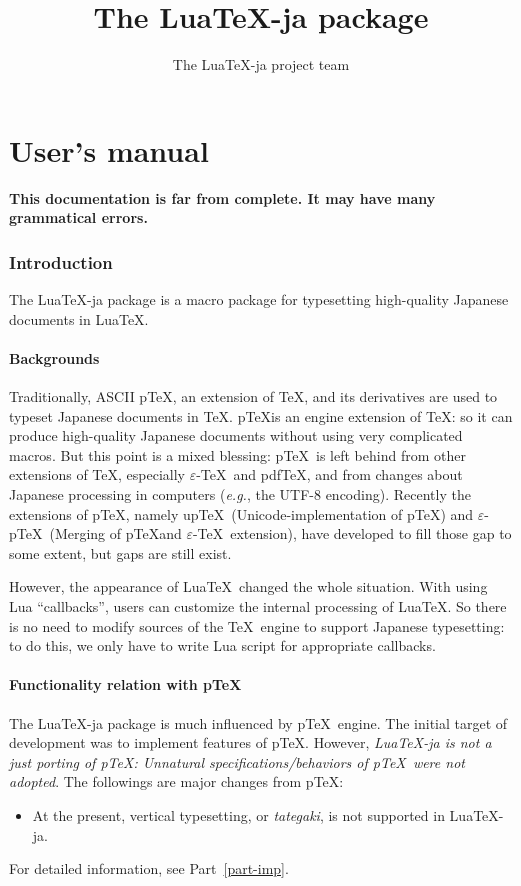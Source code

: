 \documentclass[a4paper,titlepage]{article}
\title{The Lua\TeX-ja package}
\author{The Lua\TeX-ja project team}
\begin{document}
\maketitle
\part{User's manual}
{\Large\bf This documentation is far from complete. It may have many grammatical errors.}

\section{Introduction}

The Lua\TeX-ja package is a macro package for typesetting high-quality Japanese documents in Lua\TeX.

\subsection{Backgrounds}
Traditionally, ASCII p\TeX, an extension of \TeX, and its derivatives are used to typeset Japanese documents in \TeX.
p\TeX is an engine extension of \TeX: so it can produce high-quality Japanese documents without using very complicated macros.
But this point is a mixed blessing: p\TeX\ is left behind from other extensions of \TeX, especially $\varepsilon$-\TeX\ and pdf\TeX,
and from changes about Japanese processing in computers (\textit{e.g.}, the UTF-8 encoding).
Recently the extensions of p\TeX, namely up\TeX\ (Unicode-implementation of p\TeX) and 
$\varepsilon$-p\TeX\ (Merging of p\TeX and $\varepsilon$-\TeX\ extension), have developed to fill those gap to some extent,
but gaps are still exist.

However, the appearance of Lua\TeX\ changed the whole situation. With using Lua ``callbacks'', 
users can customize the internal processing of Lua\TeX. So there is no need to modify sources of the \TeX\ engine to
support Japanese typesetting: to do this, we only have to write Lua script for appropriate callbacks.

\subsection{Functionality relation with p\TeX}
The Lua\TeX-ja package is much influenced by p\TeX\ engine. The initial target of development was to implement features of p\TeX.
However, \emph{Lua\TeX-ja is not a just porting of p\TeX: Unnatural specifications/behaviors of p\TeX\ were not adopted}.
The followings are major changes from p\TeX:
\begin{itemize}
\item At the present, vertical typesetting, or \textit{tategaki}, is not supported in Lua\TeX-ja.
\end{itemize} 
For detailed information, see Part~\ref{part-imp}.
\end{document}
